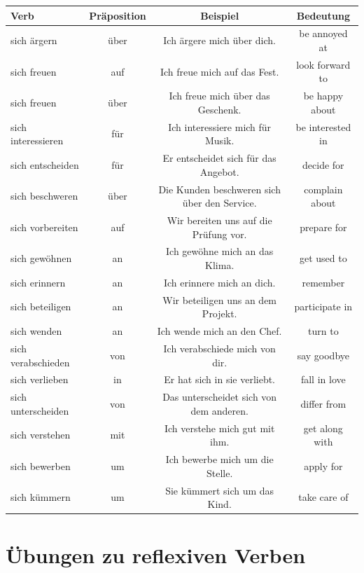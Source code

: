 \begin{center}
\begin{tabular}{|l|c|c|c|}
\hline
Verb & Präposition & Beispiel & Bedeutung \\ \hline
sich ärgern & über & Ich ärgere mich über dich. & be annoyed at \\ \hline
sich freuen & auf & Ich freue mich auf das Fest. & look forward to \\ \hline
sich freuen & über & Ich freue mich über das Geschenk. & be happy about \\ \hline
sich interessieren & für & Ich interessiere mich für Musik. & be interested in \\ \hline
sich entscheiden & für & Er entscheidet sich für das Angebot. & decide for \\ \hline
sich beschweren & über & Die Kunden beschweren sich über den Service. & complain about \\ \hline
sich vorbereiten & auf & Wir bereiten uns auf die Prüfung vor. & prepare for \\ \hline
sich gewöhnen & an & Ich gewöhne mich an das Klima. & get used to \\ \hline
sich erinnern & an & Ich erinnere mich an dich. & remember \\ \hline
sich beteiligen & an & Wir beteiligen uns an dem Projekt. & participate in \\ \hline
sich wenden & an & Ich wende mich an den Chef. & turn to \\ \hline
sich verabschieden & von & Ich verabschiede mich von dir. & say goodbye \\ \hline
sich verlieben & in & Er hat sich in sie verliebt. & fall in love \\ \hline
sich unterscheiden & von & Das unterscheidet sich von dem anderen. & differ from \\ \hline
sich verstehen & mit & Ich verstehe mich gut mit ihm. & get along with \\ \hline
sich bewerben & um & Ich bewerbe mich um die Stelle. & apply for \\ \hline
sich kümmern & um & Sie kümmert sich um das Kind. & take care of \\ \hline
\end{tabular}
\end{center}

\section{Übungen zu reflexiven Verben}
\label{sec:ReflexivUebungen}

